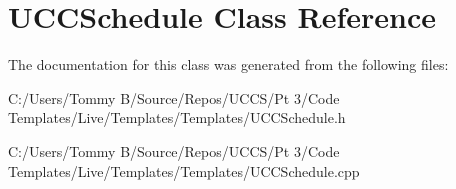 \hypertarget{class_u_c_c_schedule}{}\section{U\+C\+C\+Schedule Class Reference}
\label{class_u_c_c_schedule}


The documentation for this class was generated from the following files\+:\begin{DoxyCompactItemize}
\item 
C\+:/\+Users/\+Tommy B/\+Source/\+Repos/\+U\+C\+C\+S/\+Pt 3/\+Code Templates/\+Live/\+Templates/\+Templates/U\+C\+C\+Schedule.\+h\item 
C\+:/\+Users/\+Tommy B/\+Source/\+Repos/\+U\+C\+C\+S/\+Pt 3/\+Code Templates/\+Live/\+Templates/\+Templates/U\+C\+C\+Schedule.\+cpp\end{DoxyCompactItemize}
